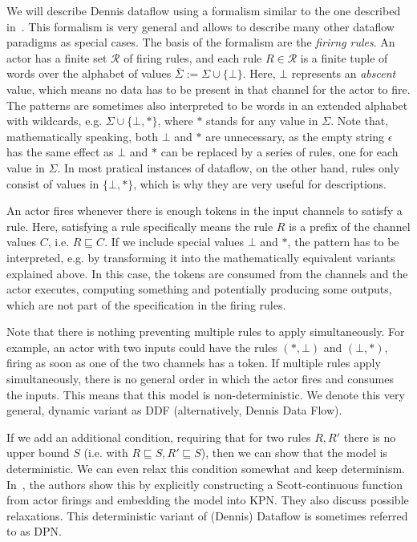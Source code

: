 We will describe Dennis dataflow using a formalism similar to the one described in~\cite{Parks:M95:105,lee_matsikoudis_semantics}.
This formalism is very general and allows to describe many other dataflow paradigms as special cases.
The basis of the formalism are the \emph{firirng rules}.
An actor has a finite set $\mathcal{R}$ of firing rules, and each rule $R \in \mathcal{R}$ is a finite tuple of words over the alphabet of values $\bar \Sigma := \Sigma \cup \{\bot\}$.
Here, $\bot$ represents an \emph{abscent} value, which means no data has to be present in that channel for the actor to fire.
The patterns are sometimes also interpreted to be words in an extended alphabet with wildcards, e.g. $\Sigma \cup \{\bot,*\}$, where $*$ stands for any value in $\Sigma$.
Note that, mathematically speaking, both $\bot$ and $*$ are unnecessary, as the empty string $\epsilon$ has the same effect as $\bot$ and $*$ can be replaced by a series of rules, one for each value in $\Sigma$.
In most pratical instances of dataflow, on the other hand, rules only consist of values in $\{\bot,*\}$, which is why they are very useful for descriptions.

An actor fires whenever there is enough tokens in the input channels to satisfy a rule.
Here, satisfying a rule specifically means the rule $R$ is a prefix of the channel values $C$, i.e. $R \sqsubseteq C$.
If we include special values $\bot$ and $*$, the pattern has to be interpreted, e.g. by transforming it into the mathematically equivalent variants explained above.
In this case, the tokens are consumed from the channels and the actor executes, computing something and potentially producing some outputs, which are not part of the specification in the firing rules.

Note that there is nothing preventing multiple rules to apply simultaneously. For example, an actor with two inputs could have the rules $(*,\bot)$ and $(\bot,*)$, firing as soon as one of the two channels has a token.
If multiple rules apply simultaneously, there is no general order in which the actor fires and consumes the inputs. 
This means that this model is non-deterministic.
We denote this very general, dynamic variant as \ac{DDF} (alternatively, Dennis Data Flow).

If we add an additional condition, requiring that for two rules $R,R'$ there is no upper bound $S$ (i.e. with $R \sqsubseteq S, R' \sqsubseteq S$), then we can show that the model is deterministic.
We can even relax this condition somewhat and keep determinism. In~\cite{lee_matsikoudis_semantics}, the authors show this by explicitly constructing a Scott-continuous function from actor firings and embedding the model into \ac{KPN}.
They also discuss possible relaxations.
This deterministic variant of (Dennis) Dataflow is sometimes referred to as \ac{DPN}.

